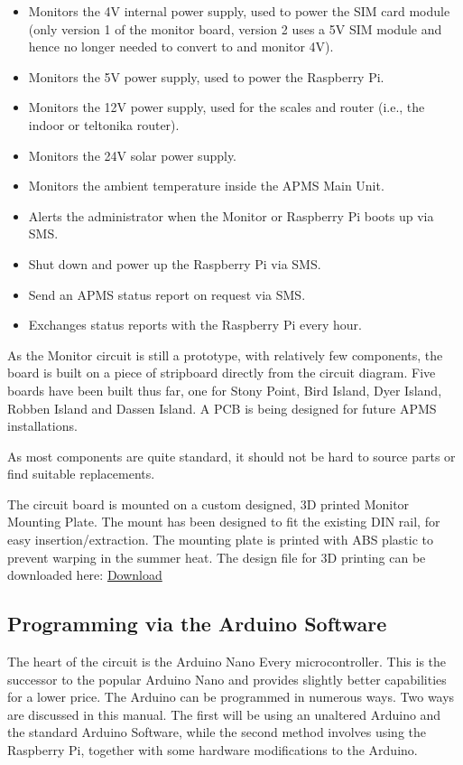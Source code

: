 \documentclass[
  letterpaper,
]{scrbook}
\begin{document}
\begin{itemize}
\item
  Monitors the 4V internal power supply, used to power the SIM card
  module (only version 1 of the monitor board, version 2 uses a 5V SIM
  module and hence no longer needed to convert to and monitor 4V).
\item
  Monitors the 5V power supply, used to power the Raspberry Pi.
\item
  Monitors the 12V power supply, used for the scales and router (i.e.,
  the indoor or teltonika router).
\item
  Monitors the 24V solar power supply.
\item
  Monitors the ambient temperature inside the APMS Main Unit.
\item
  Alerts the administrator when the Monitor or Raspberry Pi boots up via
  SMS.
\item
  Shut down and power up the Raspberry Pi via SMS.
\item
  Send an APMS status report on request via SMS.
\item
  Exchanges status reports with the Raspberry Pi every hour.
\end{itemize}

As the Monitor circuit is still a prototype, with relatively few
components, the board is built on a piece of stripboard directly from
the circuit diagram. Five boards have been built thus far, one for Stony
Point, Bird Island, Dyer Island, Robben Island and Dassen Island. A PCB
is being designed for future APMS installations.

As most components are quite standard, it should not be hard to source
parts or find suitable replacements.

The circuit board is mounted on a custom designed, 3D printed Monitor
Mounting Plate. The mount has been designed to fit the existing DIN
rail, for easy insertion/extraction. The mounting plate is printed with
ABS plastic to prevent warping in the summer heat. The design file for
3D printing can be downloaded here:
\href{files/Monitor_V_0_5.3mf}{Download}

\subsection{Programming via the Arduino
Software}\label{programming-via-the-arduino-software}

The heart of the circuit is the Arduino Nano Every microcontroller. This
is the successor to the popular Arduino Nano and provides slightly
better capabilities for a lower price. The Arduino can be programmed in
numerous ways. Two ways are discussed in this manual. The first will be
using an unaltered Arduino and the standard Arduino Software, while the
second method involves using the Raspberry Pi, together with some
hardware modifications to the Arduino.
\end{document}
